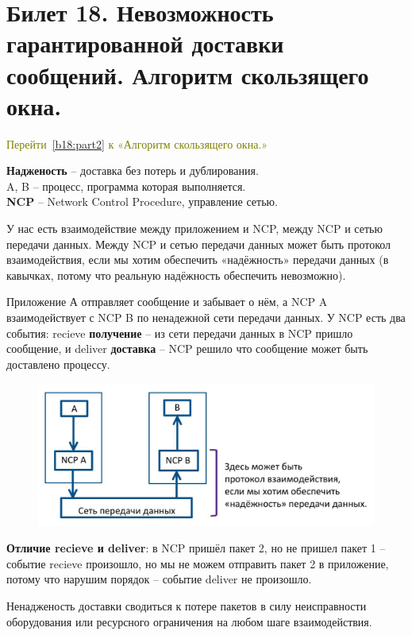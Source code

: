 \newpage
\section{Билет 18. Невозможность гарантированной доставки сообщений. Алгоритм скользящего окна.} \label{b18:part1}

\textcolor{olive}{Перейти~\ref{b18:part2} к «Алгоритм скользящего окна.»}

\textbf{Надженость} -- доставка без потерь и дублирования. \\
A, B -- процесс, программа которая выполняется.\\
\textbf{NCP} -- Network Control Procedure, управление сетью.

У нас есть взаимодействие между приложением и NCP, между NCP и сетью передачи данных.
Между NCP и сетью передачи данных может быть протокол взаимодействия, если мы хотим обеспечить «надёжность» передачи данных (в кавычках, потому что реальную надёжность обеспечить невозможно).

Приложение А отправляет сообщение и забывает о нём, а NCP A взаимодействует с NCP B по ненадежной сети передачи данных.
У NCP есть два события: recieve \textbf{получение} -- из сети передачи данных в NCP пришло сообщение, и deliver \textbf{доставка} -- NCP решило что сообщение может быть доставлено процессу.
\newline
\begin{figure}[H] \centering
	\includegraphics[scale = 0.35]{18/common.jpg}
\end{figure}

\textbf{Отличие recieve и deliver}: в NCP пришёл пакет 2, но не пришел пакет 1 -- событие recieve произошло, но мы не можем отправить пакет 2 в приложение, потому что нарушим порядок -- событие deliver не произошло.

Ненадженость доставки сводиться к потере пакетов в силу неисправности оборудования или ресурсного ограничения на любом шаге взаимодействия.
\bigskip

